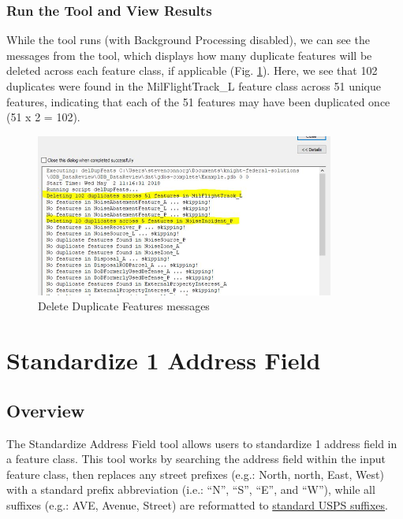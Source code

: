 \documentclass[openany]{book}
\theoremstyle{definition}
\theoremstyle{definition}
\theoremstyle{definition}
\theoremstyle{remark}
\begin{document}
\subsection{Run the Tool and View
Results}\label{run-the-tool-and-view-results-6}

While the tool runs (with Background Processing disabled), we can see
the messages from the tool, which displays how many duplicate features
will be deleted across each feature class, if applicable (Fig.
\ref{fig:delFmessages}). Here, we see that 102 duplicates were found in
the MilFlightTrack\_L feature class across 51 unique features,
indicating that each of the 51 features may have been duplicated once
(51 x 2 = 102).

\begin{figure}[H]

{\centering \includegraphics[width=3.86in,]{figures/delF-messages} 

}

\caption{Delete Duplicate Features messages}\label{fig:delFmessages}
\end{figure}

\hypertarget{stdAdd1}{\chapter{Standardize 1 Address
Field}\label{stdAdd1}}

\section{Overview}\label{overview-7}

The Standardize Address Field tool allows users to standardize 1 address
field in a feature class. This tool works by searching the address field
within the input feature class, then replaces any street prefixes (e.g.:
North, north, East, West) with a standard prefix abbreviation (i.e.:
``N'', ``S'', ``E'', and ``W''), while all suffixes (e.g.: AVE, Avenue,
Street) are reformatted to
\href{https://github.com/allanbreyes/udacity-data-science/blob/master/p2/data/suffixes.csv}{standard
USPS suffixes}.
\end{document}
